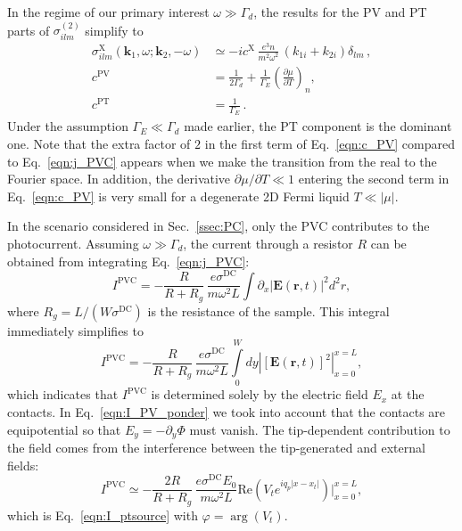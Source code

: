 \documentclass[aps, prb, reprint, superscriptaddress]{revtex4-2}
\renewcommand{\vec}{\mathbf}
\begin{document}
In the regime of our primary interest $\omega\gg \Gamma_d$, the results for the PV and PT parts of $\sigma_{ilm}^{(2)}$ simplify to
\begin{align}
\sigma_{ilm}^{\mathrm{X}}\left(\vec{k}_1, \omega; \vec{k}_2, -\omega\right) &\simeq -i c^{\mathrm{X}}\, \frac{e^3 n}{m^2 \omega^2}\,
(k_{1i} + k_{2i}) \delta_{lm}\,,
\label{eqn:sigma^X}\\
c^{\mathrm{PV}} &=
	\frac{1}{2 \Gamma_d} + \frac{1}{\Gamma_E} \left(\frac{\partial\mu}{\partial T}\right)_n,
\label{eqn:c_PV}\\
c^{\mathrm{PT}} &= \frac{1}{\Gamma_E}\,.
\label{eqn:c_PT}
\end{align}
Under the assumption $\Gamma_E \ll \Gamma_d$ made earlier, the PT component is the dominant one.
Note that the extra factor of $2$ in the first term of Eq.~\eqref{eqn:c_PV} compared to Eq.~\eqref{eqn:j_PVC} appears when we make the transition from the real to the Fourier space.
In addition, the derivative ${\partial\mu} / {\partial T} \ll 1$ entering the second term in Eq.~\eqref{eqn:c_PV} is very small for a degenerate 2D Fermi liquid $T \ll |\mu|$. 

In the scenario considered in Sec.~\ref{ssec:PC}, only the PVC contributes to the photocurrent. 
Assuming $\omega\gg\Gamma_d$, the current through a resistor $R$ can be obtained from integrating Eq.~\eqref{eqn:j_PVC}: 
\begin{equation}
	I^\mathrm{PVC} 
	= -\frac{R}{R + R_{g}}\,
	\frac{e \sigma^\mathrm{DC}}{m \omega^2 L} \int \partial_x \left| \vec{E}(\vec{r}, t) \right|^2 d^2 r,
	\label{eqn:I_PV_ponder1}
\end{equation}
where $R_g = {L} / {(W\sigma^\mathrm{DC})}$ is the resistance of the sample. 
This integral immediately simplifies to
\begin{equation}
	\label{eqn:I_PV_ponder}
	I^\mathrm{PVC}
	= -\frac{R}{R + R_{g}}\,
	\frac{e \sigma^\mathrm{DC}}{m \omega^2 L} \int\limits_0^{W} d y \left| [\vec{E}(\vec{r}, t)]^2 \right|^{x = L}_{x = 0},
\end{equation}
which indicates that $I^\mathrm{PVC}$ is determined solely by the electric field $E_x$ at the contacts.
In Eq.~\eqref{eqn:I_PV_ponder} we took into account that the contacts are equipotential so that $E_y = -\partial_y \Phi$ must vanish.
The tip-dependent contribution to the field comes from the interference between the tip-generated and external fields: 
\begin{equation}
	I^\mathrm{PVC} \simeq -\frac{2R}{R + R_g}\,
	\frac{e\sigma^\mathrm{DC}E_0}{m\omega^2 L}
	\mathrm{Re}\left(V_t e^{i q_p |x - x_{t}|}\right)\bigg|^{x = L}_{x = 0}, 
	\label{eqn:I_ptsource_detailed}
\end{equation} 
which is Eq.~\eqref{eqn:I_ptsource} with $\varphi = \arg(V_t)$. 
\end{document}
